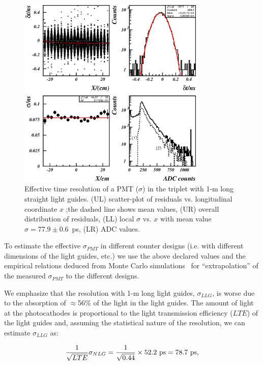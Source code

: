 \begin{figure}[htbp]
\centering
\includegraphics[width=0.8\textwidth]{cosmic-6pmtllg_picture.ps}
\caption{\small{Effective time resolution of a PMT ($\sigma$) in the triplet 
with 1-m long straight light guides.  (UL) scatter-plot of residuals vs. 
longitudinal coordinate $x$ ;the dashed line shows mean values, (UR) overall 
distribution of residuals, (LL) local $\sigma$ vs. $x$ with mean value 
$\sigma=77.9\pm0.6$~ps, (LR) ADC values.}}
\label{lgres}
\end{figure}

To estimate the effective $\sigma_{PMT}$ in different counter designs (i.e. 
with different dimensions of the light guides, etc.) we use the above 
declared values and the empirical relations deduced from Monte Carlo 
simulations~\cite{mutch} for ``extrapolation'' of the measured $\sigma_{PMT}$ 
to the different designs.

We emphasize that the resolution with 1-m long light guides, $\sigma_{LLG}$, 
is worse due to the absorption of $\approx$56\% of the light in the light 
guides.  The amount of light at the photocathodes is proportional to the 
light transmission efficiency ($LTE$) of the light guides and, assuming the 
statistical nature of the resolution, we can estimate $\sigma_{LLG}$ as:

\begin{equation}
\frac{1}{\sqrt{LTE}}\sigma_{NLG} =\frac{1}{\sqrt{0.44}}\times52.2~{\rm ps}
=78.7~{\rm ps},
\label{eq31}
\end{equation}

